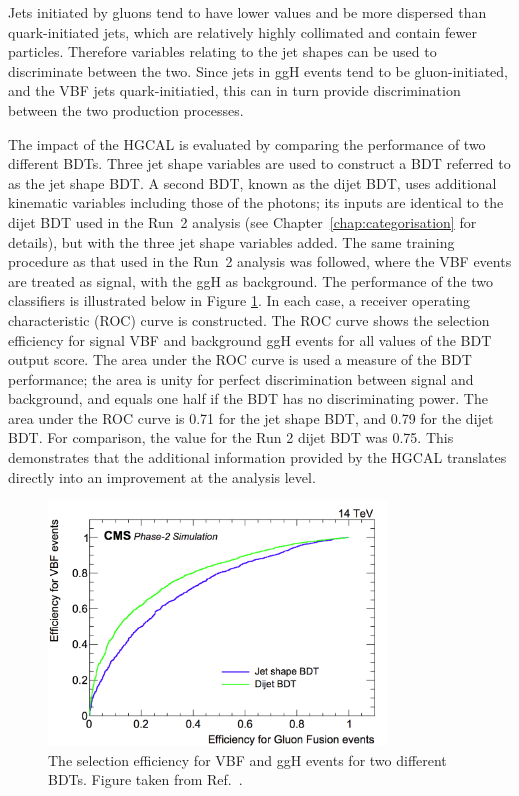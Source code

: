 Jets initiated by gluons tend to have lower \pt values and be more dispersed than quark-initiated jets, 
which are relatively highly collimated and contain fewer particles. 
Therefore variables relating to the jet shapes can be used to discriminate between the two.
Since jets in ggH events tend to be gluon-initiated, 
and the VBF jets quark-initiatied, 
this can in turn provide discrimination between the two production processes.

The impact of the HGCAL is evaluated by comparing the performance of two different BDTs.
Three jet shape variables are used to construct a BDT referred to as the jet shape BDT.
A second BDT, known as the dijet BDT, uses additional kinematic variables including those of the photons; 
its inputs are identical to the dijet BDT used in the Run~2 analysis 
(see Chapter~\ref{chap:categorisation} for details), but with the three jet shape variables added.
The same training procedure as that used in the Run~2 analysis was followed, 
where the VBF events are treated as signal, with the ggH as background.
The performance of the two classifiers is illustrated below in Figure \ref{fig:hgcal_VBFvsGGH}.
In each case, a receiver operating characteristic (ROC) curve is constructed.
The ROC curve shows the selection efficiency for signal VBF and background ggH events 
for all values of the BDT output score.
The area under the ROC curve is used a measure of the BDT performance; 
the area is unity for perfect discrimination between signal and background, 
and equals one half if the BDT has no discriminating power.
The area under the ROC curve is 0.71 for the jet shape BDT, and 0.79 for the dijet BDT.
For comparison, the value for the Run 2 dijet BDT was 0.75.
This demonstrates that the additional information provided by the HGCAL translates directly
into an improvement at the analysis level.

\begin{figure}[h!]
  \centering
  \includegraphics[width=0.8\textwidth]{Figures/HGCAL/VBFvsGGH.png}
  \caption[VBF and ggH selection efficiencies for two BDTs.]
  {
    The selection efficiency for VBF and ggH events for two different BDTs. 
    Figure taken from Ref.~\cite{HGCAL}.
  }
  \label{fig:hgcal_VBFvsGGH}
\end{figure}


